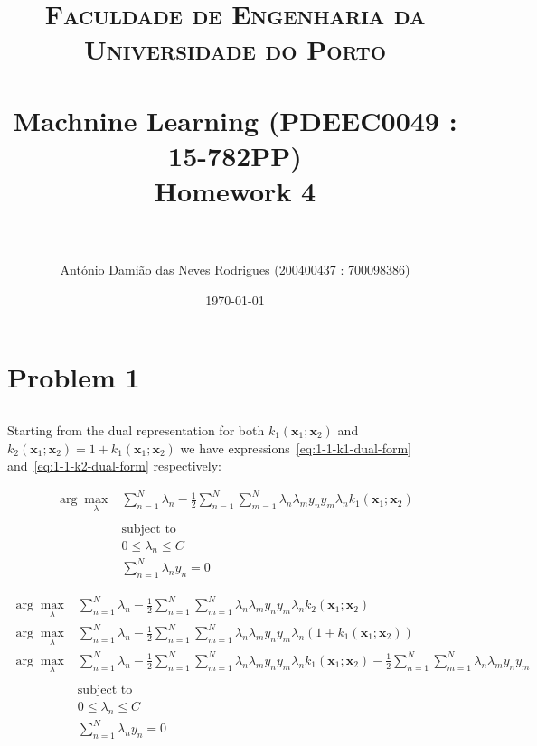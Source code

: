 \documentclass[paper=a4, fontsize=11pt]{scrartcl} %
\title{	
\normalfont \normalsize 
\textsc{Faculdade de Engenharia da Universidade do Porto} \\ [25pt] %
\horrule{0.5pt} \\[0.4cm] %
\LARGE Machnine Learning (PDEEC0049 : 15-782PP)\\ \Large Homework 4 \\ %
\horrule{2pt} \\[0.5cm] %
}
\author{António Damião das Neves Rodrigues (200400437 : 700098386)} %
\date{\normalsize\today} %
\numberwithin{equation}{section} %
\numberwithin{figure}{section} %
\numberwithin{table}{section} %
\begin{document}
\maketitle %

\section{Problem 1}

\subsection{}
\label{subsec:1-1}

Starting from the dual representation for both $k_1(\textbf{x}_1;\textbf{x}_2)$ 
and $k_2(\textbf{x}_1;\textbf{x}_2) = 1 + k_1(\textbf{x}_1;\textbf{x}_2)$ we 
have expressions~\ref{eq:1-1-k1-dual-form} and~\ref{eq:1-1-k2-dual-form} 
respectively:

\begin{equation}
\begin{split}
    \arg\max_\lambda & \sum_{n=1}^{N}\lambda_n - \frac{1}{2}\sum_{n=1}^{N}\sum_{m=1}^{N}\lambda_n\lambda_{m}y_{n}y_{m}\lambda_nk_1(\textbf{x}_1;\textbf{x}_2)\\
    \\
    & \text{subject to}\\
    & 0 \le \lambda_n \le C\\
    & \sum_{n=1}^{N}\lambda_{n}y_{n} = 0
    \label{eq:1-1-k1-dual-form}
\end{split}
\end{equation}

\begin{equation}
\begin{split}
    \arg\max_\lambda & \sum_{n=1}^{N}\lambda_n - \frac{1}{2}\sum_{n=1}^{N}\sum_{m=1}^{N}\lambda_n\lambda_{m}y_{n}y_{m}\lambda_nk_2(\textbf{x}_1;\textbf{x}_2)\\
    \arg\max_\lambda & \sum_{n=1}^{N}\lambda_n - \frac{1}{2}\sum_{n=1}^{N}\sum_{m=1}^{N}\lambda_n\lambda_{m}y_{n}y_{m}\lambda_n(1 + k_1(\textbf{x}_1;\textbf{x}_2))\\
    \arg\max_\lambda & \sum_{n=1}^{N}\lambda_n - \frac{1}{2}\sum_{n=1}^{N}\sum_{m=1}^{N}\lambda_n\lambda_{m}y_{n}y_{m}\lambda_nk_1(\textbf{x}_1;\textbf{x}_2) - \frac{1}{2}\sum_{n=1}^{N}\sum_{m=1}^{N}\lambda_n\lambda_{m}y_{n}y_{m}\\
    \\
    & \text{subject to}\\
    & 0 \le \lambda_n \le C\\
    & \sum_{n=1}^{N}\lambda_{n}y_{n} = 0
    \label{eq:1-1-k2-dual-form}
\end{split}
\end{equation}
\end{document}
